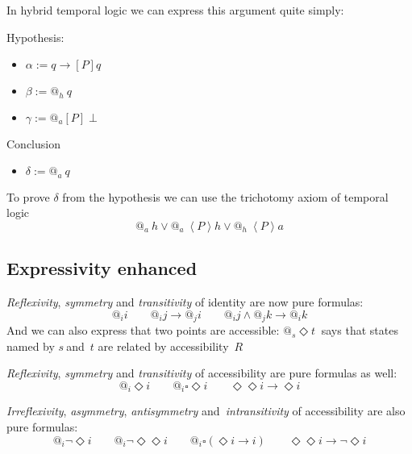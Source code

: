 In hybrid temporal logic we can express this argument quite simply:

Hypothesis:

\begin{itemize}
\item $\alpha :=q\rightarrow [P] q$

\item $\beta :=@_{h}\ q$

\item $\gamma :=@_{a}[P] \perp$
\end{itemize}

Conclusion

\begin{itemize}
\item $\delta :=@_{a}\ q$
\end{itemize}

To prove $\delta $ from the hypothesis we can use the trichotomy axiom of
temporal logic 
$$
@_{a}\ h\vee @_{a}\ \left\langle P\right\rangle h\vee @_{h}\ \left\langle
P\right\rangle a
$$

\subsection{Expressivity enhanced}

\emph{Reflexivity}, \emph{symmetry} and \emph{transitivity} of identity are
now pure formulas:%
$$
@_{i}i\qquad @_{i}j\rightarrow @_{j}i\qquad @_{i}j\wedge @_{j}k\rightarrow
@_{i}k
$$
And we can also express that two points are accessible: $@_{s}\Diamond t\ $%
says that states named by $s\ $and\ $t$ are related by accessibility\ $R$

\emph{Reflexivity}, \emph{symmetry} and \emph{transitivity} of accessibility
are pure formulas as well:%
$$
@_{i}\Diamond i\qquad @_{i}\square \Diamond i\qquad \Diamond \Diamond
i\rightarrow \Diamond i
$$

\emph{Irreflexivity}, \emph{asymmetry}, \emph{antisymmetry} and\emph{\
intransitivity} of accessibility are also pure formulas: 
$$
@_{i}\lnot \Diamond i\qquad @_{i}\lnot \Diamond \Diamond i\qquad
@_{i}\square (\Diamond i\rightarrow i)\qquad \Diamond \Diamond i\rightarrow
\lnot \Diamond i
$$
